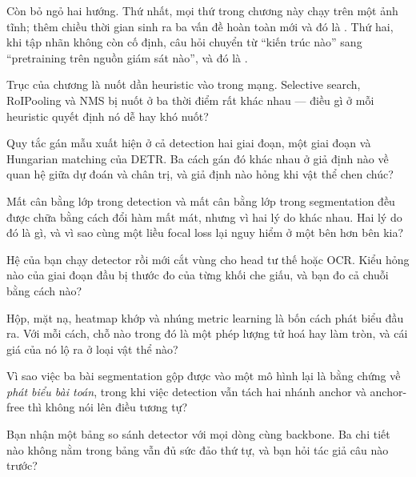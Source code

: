 \documentclass[../../deep_learning.tex]{subfiles}
\begin{document}
Còn bỏ ngỏ hai hướng. Thứ nhất, mọi thứ trong chương này chạy trên một ảnh tĩnh; thêm chiều thời gian sinh ra ba vấn đề hoàn toàn mới và đó là . Thứ hai, khi tập nhãn không còn cố định, câu hỏi chuyển từ ``kiến trúc nào'' sang ``pretraining trên nguồn giám sát nào'', và đó là .
\begin{tukiem}
\item Trục của chương là nuốt dần heuristic vào trong mạng. Selective search, RoIPooling và NMS bị nuốt ở ba thời điểm rất khác nhau --- điều gì ở mỗi heuristic quyết định nó dễ hay khó nuốt?
\item Quy tắc gán mẫu xuất hiện ở cả detection hai giai đoạn, một giai đoạn và Hungarian matching của DETR. Ba cách gán đó khác nhau ở giả định nào về quan hệ giữa dự đoán và chân trị, và giả định nào hỏng khi vật thể chen chúc?
\item Mất cân bằng lớp trong detection và mất cân bằng lớp trong segmentation đều được chữa bằng cách đổi hàm mất mát, nhưng vì hai lý do khác nhau. Hai lý do đó là gì, và vì sao cùng một liều focal loss lại nguy hiểm ở một bên hơn bên kia?
\item Hệ của bạn chạy detector rồi mới cắt vùng cho head tư thế hoặc OCR. Kiểu hỏng nào của giai đoạn đầu bị thước đo của từng khối che giấu, và bạn đo cả chuỗi bằng cách nào?
\item Hộp, mặt nạ, heatmap khớp và nhúng metric learning là bốn cách phát biểu đầu ra. Với mỗi cách, chỗ nào trong đó là một phép lượng tử hoá hay làm tròn, và cái giá của nó lộ ra ở loại vật thể nào?
\item Vì sao việc ba bài segmentation gộp được vào một mô hình lại là bằng chứng về \emph{phát biểu bài toán}, trong khi việc detection vẫn tách hai nhánh anchor và anchor-free thì không nói lên điều tương tự?
\item Bạn nhận một bảng so sánh detector với mọi dòng cùng backbone. Ba chi tiết nào không nằm trong bảng vẫn đủ sức đảo thứ tự, và bạn hỏi tác giả câu nào trước?
\end{tukiem}
\ifSubfilesClassLoaded{\printbibliography[title={Nguồn}]}{}
\end{document}
